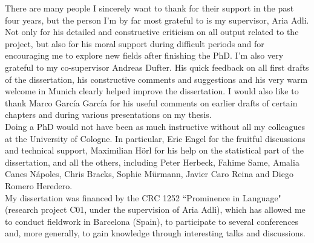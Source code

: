 \addchap{\lsAcknowledgementTitle} 
\markdouble{\lsAcknowledgementTitle}
There are many people I sincerely want to thank for their support in the past four years, but the person I’m by far most grateful to is my supervisor, Aria Adli. Not only for his detailed and constructive criticism on all output related to the project, but also for his moral support during difficult periods and for encouraging me to explore new fields after finishing the PhD. 
I’m also very grateful to my co-supervisor Andreas Dufter. His quick feedback on all first drafts of the dissertation, his constructive comments and suggestions and his very warm welcome in Munich clearly helped improve the dissertation. I would also like to thank Marco García García for his useful comments on earlier drafts of certain chapters and during various presentations on my thesis.\\
Doing a PhD would not have been as much instructive without all my colleagues at the University of Cologne. In particular, Eric Engel for the fruitful discussions and technical support, Maximilian Hörl for his help on the statistical part of the dissertation, and all the others, including Peter Herbeck, Fahime Same, Amalia Canes Nápoles, Chris Bracks, Sophie Mürmann, Javier Caro Reina and Diego Romero Heredero.\\
My dissertation was financed by the CRC 1252 ``Prominence in Language" (research project C01, under the supervision of Aria Adli), which has allowed me to conduct fieldwork in Barcelona (Spain), to participate to several conferences and, more generally, to gain knowledge through interesting talks and discussions.

